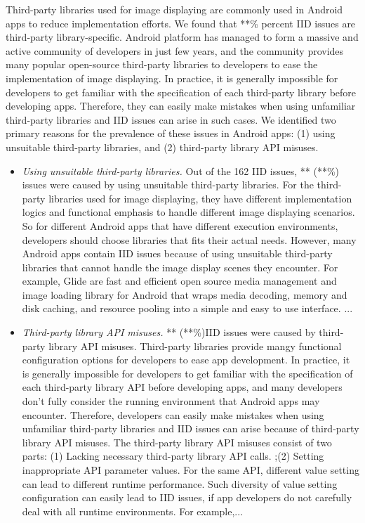 Third-party libraries used for image displaying are commonly used in Android apps to reduce implementation efforts. 
We found that **\% percent IID issues are third-party library-specific. Android platform has managed to form a massive and active community of developers in just few years, and the community provides many popular open-source third-party libraries to developers to ease the implementation of image displaying. In practice, it is generally impossible for developers to get familiar with the specification of each third-party library before developing apps. Therefore, they can easily make mistakes when using unfamiliar third-party libraries and IID issues can arise in such cases. 
We identified two primary reasons for the prevalence of these issues in Android apps: (1) using unsuitable third-party libraries, and (2) third-party library API misuses.

\begin{itemize}  
	\item \emph{Using unsuitable third-party libraries.}
	Out of the 162 IID issues, ** (**\%) issues were caused by using unsuitable third-party libraries. For the third-party libraries used for image displaying, they have different implementation logics and functional emphasis to handle different image displaying scenarios. So for different Android apps that have different execution environments, developers should choose libraries that fits their actual needs. However, many Android apps contain IID issues because of using unsuitable third-party libraries that cannot handle the image display scenes they encounter. 
	For example, Glide are fast and efficient open source media management and image loading library for Android that wraps media decoding, memory and disk caching, and resource pooling into a simple and easy to use interface. ...
	
	\item \emph{Third-party library API misuses.} 
	** (**\%)IID issues were caused by third-party library API misuses. Third-party libraries provide mangy functional configuration options for developers to ease app development. In practice, it is generally impossible for developers to get familiar with the specification of each third-party library API before developing apps, and many developers don't fully consider the running environment that Android apps may encounter. Therefore, developers can easily make mistakes when using unfamiliar third-party libraries and IID issues can arise because of third-party library API misuses. The third-party library API misuses consist of two parts: (1) Lacking necessary third-party library API calls. ;(2) Setting inappropriate API parameter values. For the same API, different value setting can lead to different runtime performance. Such diversity of value setting configuration can easily lead to IID issues, if app developers do not carefully deal with all runtime environments. For example,...
	
	
\end{itemize}

